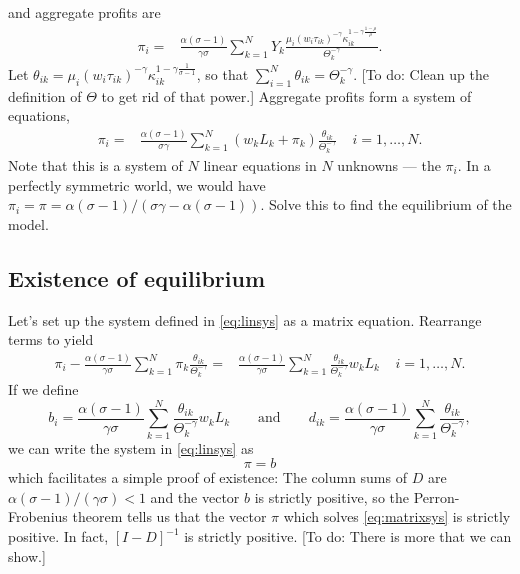 \documentclass[11pt, pdftex]{article}
\begin{document}
and aggregate profits are
\begin{align}
  \pi_i  =& \frac{\alpha(\sigma-1)}{\gamma\sigma}  \sum_{k=1}^NY_k  \frac{\mu_i(w_i\tau_{ik})^{-\gamma}\kappa_{ik}^{1-\gamma\frac{1-\rho}{\rho}}}{\Theta_k^{-\gamma}}.
\end{align}
Let $\theta_{ik}=\mu_i(w_i\tau_{ik})^{-\gamma}\kappa_{ik}^{1-\gamma\frac{1}{\sigma-1}}$, so that $\sum_{i=1}^N\theta_{ik}=\Theta_k^{-\gamma}$. [To do: Clean up the definition of $\Theta$ to get rid of that power.]
Aggregate profits form a system of equations,
\begin{align}
  \pi_i  =& \frac{\alpha(\sigma-1)}{\sigma\gamma}  \sum_{k=1}^N (w_kL_k + \pi_k)  \frac{\theta_{ik}}{\Theta_k^{-\gamma}} \;\;\;\; i=1,\ldots,N. \label{eq:linsys}
\end{align}
Note that this is a system of $N$ linear equations in $N$ unknowns --- the $\pi_i$.  In a perfectly symmetric world, we would have $\pi_i=\pi=\alpha(\sigma-1)/(\sigma\gamma-\alpha(\sigma-1))$. Solve this to find the equilibrium of the model.

\subsection*{Existence of equilibrium}
Let's set up the system defined in \eqref{eq:linsys} as a matrix equation.  Rearrange terms to yield
\begin{align}
    \pi_i - \frac{\alpha(\sigma-1)}{\gamma\sigma}\sum_{k=1}^N \pi_k\frac{\theta_{ik}}{\Theta_k^{-\gamma}}  =&  \frac{\alpha(\sigma-1)}{\gamma\sigma}\sum_{k=1}^N \frac{\theta_{ik}}{\Theta_k^{-\gamma}}w_kL_k \;\;\;\; i=1,\ldots,N.
\end{align}
If we define
\begin{equation}
  b_i = \frac{\alpha(\sigma-1)}{\gamma\sigma}\sum_{k=1}^N \frac{\theta_{ik}}{\Theta_k^{-\gamma}}w_kL_k  \qquad \text{and} \qquad d_{ik}=\frac{\alpha(\sigma-1)}{\gamma\sigma}\sum_{k=1}^N\frac{\theta_{ik}}{\Theta_k^{-\gamma}},
\end{equation}
we can write the system in \eqref{eq:linsys} as
\begin{equation}
  [I-D]\pi=b \label{eq:matrixsys}
\end{equation}
which facilitates a simple proof of existence:  The column sums of $D$ are $\alpha(\sigma-1)/(\gamma\sigma)<1$ and the vector $b$ is strictly positive, so the Perron-Frobenius theorem tells us that the vector $\pi$ which solves   \eqref{eq:matrixsys} is strictly positive.   In fact, $[I-D]^{-1}$ is strictly positive. [To do: There is more that we can show.]
\end{document}
